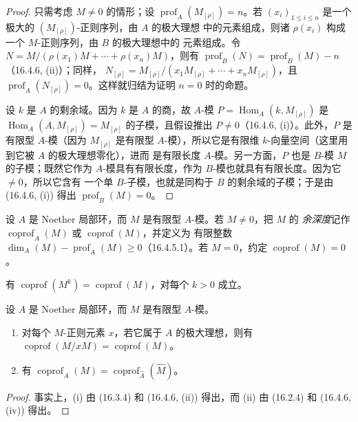 \begin{proof}
只需考虑 $M\neq0$ 的情形；设 $\operatorname{prof}_A(M_{[\rho]})=n$。若
$(x_i)_{1\leq i\leq n}$ 是一个极大的 $(M_{[\rho]})$-正则序列，由 $A$ 的极大理想
中的元素组成，则诸 $\rho(x_i)$ 构成一个 $M$-正则序列，由 $B$ 的极大理想中的
元素组成。令
$N=M/(\rho(x_1)M+\cdots+\rho(x_n)M)$，则有
$\operatorname{prof}_B(N)=\operatorname{prof}_B(M)-n$（16.4.6, (ii)）；同样，
$N_{[\rho]}=M_{[\rho]}/(x_1M_{[\rho]}+\cdots+x_nM_{[\rho]})$，且
$\operatorname{prof}_A(N_{[\rho]})=0$。这样就归结为证明 $n=0$ 时的命题。

设 $k$ 是 $A$ 的剩余域。因为 $k$ 是 $A$ 的商，故 $A$-模
$P=\operatorname{Hom}_A(k,M_{[\rho]})$ 是
$\operatorname{Hom}_A(A,M_{[\rho]})=M_{[\rho]}$ 的子模，且假设推出
$P\neq0$（16.4.6, (i)）。此外，$P$ 是有限型 $A$-模（因为 $M_{[\rho]}$ 是有限型
$A$-模），所以它是有限维 $k$-向量空间（这里用到它被 $A$ 的极大理想零化），进而
是有限长度 $A$-模。另一方面，$P$ 也是 $B$-模 $M$ 的子模；既然它作为
$A$-模具有有限长度，作为 $B$-模也就具有有限长度。因为它 $\neq0$，所以它含有
一个单 $B$-子模，也就是同构于 $B$ 的剩余域的子模；于是由 (16.4.6, (i)) 得出
$\operatorname{prof}_B(M)=0$。
\end{proof}

\begin{definition}[16.4.9]
\label{0.16.4.9-fr}
设 $A$ 是 Noether 局部环，而 $M$ 是有限型 $A$-模。若 $M\neq0$，把 $M$ 的
\emph{余深度}记作 $\operatorname{coprof}_A(M)$ 或 $\operatorname{coprof}(M)$，并定义为
有限整数 $\dim_A(M)-\operatorname{prof}_A(M)\geq0$（16.4.5.1）。若 $M=0$，约定
$\operatorname{coprof}(M)=0$。

有 $\operatorname{coprof}(M^k)=\operatorname{coprof}(M)$，对每个 $k>0$ 成立。
\end{definition}

\begin{proposition}[16.4.10]
\label{0.16.4.10-fr}
设 $A$ 是 Noether 局部环，而 $M$ 是有限型 $A$-模。
\begin{enumerate}
  \item[(i)] 对每个 $M$-正则元素 $x$，若它属于 $A$ 的极大理想，则有
  $\operatorname{coprof}(M/xM)=\operatorname{coprof}(M)$。
  \item[(ii)] 有
  $\operatorname{coprof}_A(M)=\operatorname{coprof}_{\widehat A}(\widehat M)$。
\end{enumerate}
\end{proposition}

\begin{proof}
事实上，(i) 由 (16.3.4) 和 (16.4.6, (ii)) 得出，而 (ii) 由 (16.2.4) 和
(16.4.6, (iv)) 得出。
\end{proof}

